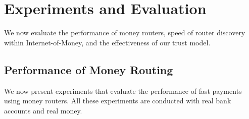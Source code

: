 

\section{Experiments and Evaluation}
We now evaluate the performance of money routers, speed of router discovery within Internet-of-Money, and the effectiveness of our trust model.

\subsection{Performance of Money Routing}
We now present experiments that evaluate the performance of fast payments using money routers.
All these experiments are conducted with real bank accounts and real money.

